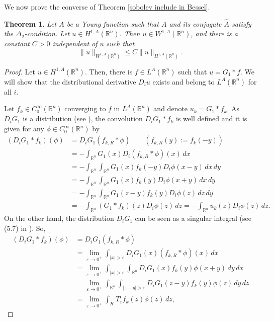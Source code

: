 \documentclass[leqno,twoside, 12pt]{amsart}
\theoremstyle{plain}
\numberwithin{equation}{section} \numberwithin{figure}{section}
\newtheorem{theorem}{Theorem}[section]
\theoremstyle{definition}
\numberwithin{equation}{section}
\begin{document}
We now prove the converse of Theorem \ref{sobolev include in Bessel}.
\begin{theorem}\label{Bessel include in Sobolev}
Let $A$ be a Young function such that $A$ and its conjugate $\hat A$  satisfy the $\Delta_2$-condition. Let $u\in H^{1, A}(\mathbb{R}^n)$. Then $u\in W^{1, A}(\mathbb{R}^n)$, and there is a constant $C>0$ independent of $u$ such that
$$\|u\|_{W^{1, A}(\mathbb{R}^n)}\leq C\|u\|_{H^{1, A}(\mathbb{R}^n)}.$$
\end{theorem}
\begin{proof}
Let $u\in H^{1, A}(\mathbb{R}^n)$. Then, there is $f\in L^A(\mathbb{R}^n)$ such that $u=G_1*f$. We will show that the distributional derivative $D_iu$ exists and belong to $L^A(\mathbb{R}^n)$ for all $i$.

 Let $f_k\in C_0^\infty(\mathbb{R}^n)$ converging to $f$ in $L^A(\mathbb{R}^n)$ and denote $u_k=G_1*f_k$. As $D_iG_1$ is a distribution (see \cite[page 27]{AS}),  the convolution $D_iG_1*f_k$ is well defined and it is given for any $\phi\in C_0^\infty(\mathbb{R}^n)$ by
\begin{equation}\label{derivative u 1}
\begin{split}
(D_iG_1*f_k)(\phi)&= D_iG_1(f_{k, R}*\phi) \qquad (f_{k, R}(y):=f_k(-y))\\& = -\int_{\mathbb{R}^n}G_1(x)D_i(f_{k, R}*\phi)(x)\,dx \\ &= -\int_{\mathbb{R}^n}\int_{\mathbb{R}^n}G_1(x)f_k(-y)D_i\phi(x-y)\,dx\,dy\\& =-\int_{\mathbb{R}^n}\int_{\mathbb{R}^n}G_1(x)f_k(y)D_i\phi(x+y)\,dx\,dy \\& =  -\int_{\mathbb{R}^n}\int_{\mathbb{R}^n}G_1(z-y)f_k(y)D_i\phi(z)\,dz\,dy\\& = -\int_{\mathbb{R}^n}(G_1*f_k)(z)D_i\phi(z)\,dz =-\int_{\mathbb{R}^n}u_k(z)D_i\phi(z)\,dz.
\end{split}
\end{equation}On the other hand, the distribution $D_iG_1$ can be seen as a singular integral (see (5.7) in \cite{AS}). So,
\begin{equation}\label{derivative u 2}
\begin{split}
(D_iG_1*f_k)(\phi)&=  D_iG_1(f_{k, R}*\phi) \\& = \lim_{\varepsilon\to 0^+}\int_{|x|>\varepsilon}D_iG_1(x)(f_{k, R}*\phi)(x)\,dx \\& = \lim_{\varepsilon\to 0^+}\int_{|x|>\varepsilon}\int_{\mathbb{R}^n}D_iG_1(x)f_k(y)\phi(x+y)\,dy\,dx\\&=\lim_{\varepsilon\to 0^+}\int_{\mathbb{R}^n}\int_{|z-y|>\varepsilon}D_iG_1(z-y)f_k(y)\phi(z)\,dy\,dz\\& = \lim_{\varepsilon\to 0^+}\int_{K}T^i_{\varepsilon}f_k(z)\phi(z)\,dz,

\end{split}
\end{equation}
\end{proof}
\end{document}
